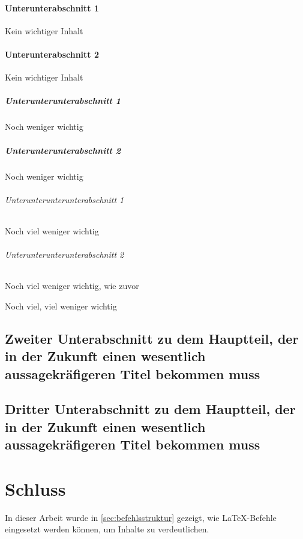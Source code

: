 \documentclass[ngerman,               %
               a4paper,               %
               fleqn,                 %
                     ]{scrreprt}
\begin{document}
  \subsubsection{Unterunterabschnitt 1}
  
  Kein wichtiger Inhalt

  \subsubsection{Unterunterabschnitt 2}

  Kein wichtiger Inhalt
  
  \paragraph{Unterunterunterabschnitt 1}
  
  Noch weniger wichtig

  \paragraph{Unterunterunterabschnitt 2}

Noch weniger wichtig

  \subparagraph{Unterunterunterunterabschnitt 1}

Noch viel weniger wichtig


  \subparagraph{Unterunterunterunterabschnitt 2}

Noch viel weniger wichtig, wie zuvor


Noch viel, viel weniger wichtig






  \section[Zweiter Unterabschnitt]{Zweiter Unterabschnitt zu
dem Hauptteil, der in der Zukunft einen wesentlich aussagekräfigeren
Titel bekommen muss}

  \section[Dritter Unterabschnitt]{Dritter Unterabschnitt zu
dem Hauptteil, der in der Zukunft einen wesentlich aussagekräfigeren
Titel bekommen muss}

  \chapter{Schluss}

  In dieser Arbeit wurde in \cref{sec:befehlsstruktur} gezeigt, wie
  \LaTeX-Befehle eingesetzt werden können, um Inhalte zu verdeutlichen.
\end{document}
